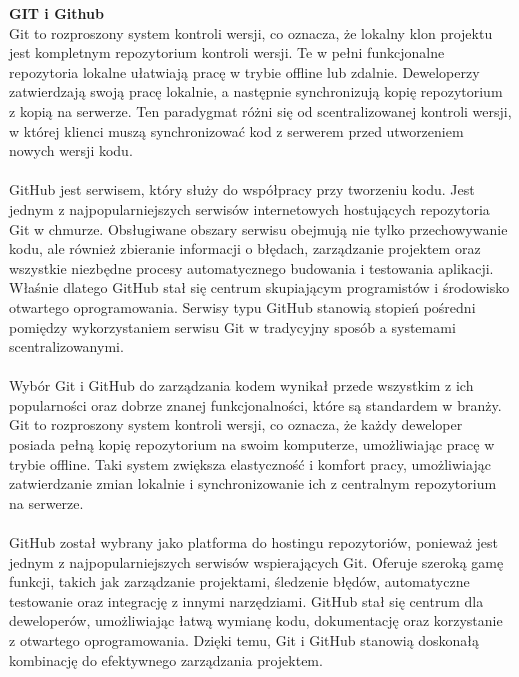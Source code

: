 \documentclass[12pt,a4paper]{article}
\begin{document}
\noindent \textbf{GIT i Github}\\
Git to rozproszony system kontroli wersji, co oznacza, że lokalny klon projektu jest kompletnym repozytorium kontroli wersji. Te w pełni funkcjonalne repozytoria lokalne ułatwiają pracę w trybie offline lub zdalnie. Deweloperzy zatwierdzają swoją pracę lokalnie, a następnie synchronizują kopię repozytorium z kopią na serwerze. Ten paradygmat różni się od scentralizowanej kontroli wersji, w której klienci muszą synchronizować kod z serwerem przed utworzeniem nowych wersji kodu.
\\\\
GitHub jest serwisem, który służy do współpracy przy tworzeniu kodu. Jest jednym z najpopularniejszych serwisów internetowych hostujących repozytoria Git w chmurze. Obsługiwane obszary serwisu obejmują nie tylko przechowywanie kodu, ale również zbieranie informacji o błędach, zarządzanie projektem oraz wszystkie niezbędne procesy automatycznego budowania i testowania aplikacji. Właśnie dlatego GitHub stał się centrum skupiającym programistów i środowisko otwartego oprogramowania. Serwisy typu GitHub stanowią stopień pośredni pomiędzy wykorzystaniem serwisu Git w tradycyjny sposób a systemami scentralizowanymi.
\\\\
Wybór Git i GitHub do zarządzania kodem wynikał przede wszystkim z ich popularności oraz dobrze znanej funkcjonalności, które są standardem w branży. Git to rozproszony system kontroli wersji, co oznacza, że każdy deweloper posiada pełną kopię repozytorium na swoim komputerze, umożliwiając pracę w trybie offline. Taki system zwiększa elastyczność i komfort pracy, umożliwiając zatwierdzanie zmian lokalnie i synchronizowanie ich z centralnym repozytorium na serwerze.
\\\\
GitHub został wybrany jako platforma do hostingu repozytoriów, ponieważ jest jednym z najpopularniejszych serwisów wspierających Git. Oferuje szeroką gamę funkcji, takich jak zarządzanie projektami, śledzenie błędów, automatyczne testowanie oraz integrację z innymi narzędziami. GitHub stał się centrum dla deweloperów, umożliwiając łatwą wymianę kodu, dokumentację oraz korzystanie z otwartego oprogramowania. Dzięki temu, Git i GitHub stanowią doskonałą kombinację do efektywnego zarządzania projektem.
\\\\
\end{document}
